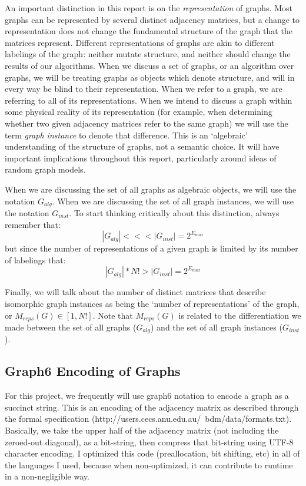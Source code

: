 An important distinction in this report is on the \emph{representation} of graphs.
Most graphs can be represented by several distinct adjacency matrices, but a change to representation does not change the fundamental structure of the graph that the matrices represent.
Different representations of graphs are akin to different labelings of the graph: neither mutate structure, and neither should change the results of our algorithms.
When we discuss a set of graphs, or an algorithm over graphs, we will be treating graphs as objects which denote structure, and will in every way be blind to their representation.
When we refer to a graph, we are referring to all of its representations.
When we intend to discuss a graph within some physical reality of its representation (for example, when determining whether two given adjacency matrices refer to the same graph) we will use the term \emph{graph instance} to denote that difference.
This is an `algebraic' understanding of the structure of graphs, not a semantic choice. 
It will have important implications throughout this report, particularly around ideas of random graph models.

When we are discussing the set of all graphs as algebraic objects, we will use the notation $G_{alg}$.
When we are discussing the set of all graph instances, we will use the notation $G_{inst}$.
To start thinking critically about this distinction, always remember that:
$$|G_{alg}| <<< |G_{inst}| = 2^{E_{max}}$$
but since the number of representations of a given graph is limited by its number of labelings that:
$$|G_{alg}| * N! > | G_{inst} | =  2^{E_{max}}$$

Finally, we will talk about the number of distinct matrices that describe isomorphic graph instances as being the `number of representations' of the graph, or $M_{reps}(G) \in [1, N!]$.
Note that  $M_{reps}(G)$ is related to the differentiation we made between the set of all graphs ($G_{alg}$) and the set of all graph instances ($G_{inst}$).

\subsection{Graph6 Encoding of Graphs}

For this project, we frequently will use graph6 notation to encode a graph as a succinct string.
This is an encoding of the adjacency matrix as described through the formal specification (http://users.cecs.anu.edu.au/~bdm/data/formats.txt).
Basically, we take the upper half of the adjacency matrix (not including the zeroed-out diagonal), as a bit-string, then compress that bit-string using UTF-8 character encoding.
I optimized this code (preallocation, bit shifting, etc) in all of the languages I used, because when non-optimized, it can contribute to runtime in a non-negligible way.

